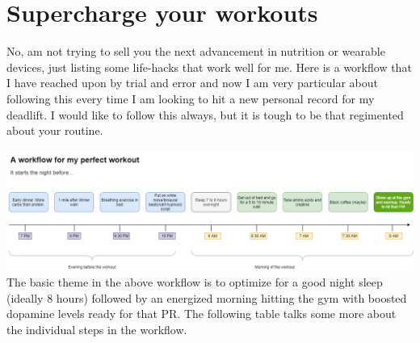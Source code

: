 \documentclass[
  oneside]{book}
\begin{document}
\hypertarget{supercharge-your-workouts}{%
\section{Supercharge your workouts}\label{supercharge-your-workouts}}

No, am not trying to sell you the next advancement in nutrition or wearable devices, just listing some life-hacks that work well for me. Here is a workflow that I have reached upon by trial and error and now I am very particular about following this every time I am looking to hit a new personal record for my deadlift. I would like to follow this always, but it is tough to be that regimented about your routine.

\includegraphics{pictures/routine.drawio.png}
The basic theme in the above workflow is to optimize for a good night sleep (ideally 8 hours) followed by an energized morning hitting the gym with boosted dopamine levels ready for that PR. The following table talks some more about the individual steps in the workflow.
\end{document}
